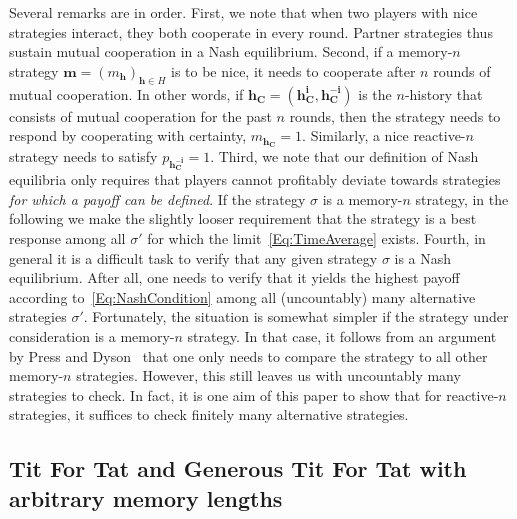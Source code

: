 \documentclass[9pt,twoside,lineno]{pnas-new}
\theoremstyle{plainCl1}
\theoremstyle{plainCl2}
\begin{document}
\noindent
Several remarks are in order. First, we note that when two players with nice strategies interact, they both cooperate in every round. Partner strategies thus sustain mutual cooperation in a Nash equilibrium. 
Second, if a memory-$n$ strategy $\mathbf{m}\!=\!(m_\mathbf{h})_{\mathbf{h}\in H}$ is to be nice, it needs to cooperate after $n$ rounds of mutual cooperation. In other words, if $\mathbf{h_C} \!=\! (\mathbf{h^i_C},\mathbf{h^{-i}_C})$ is the $n$-history that consists of mutual cooperation for the past $n$ rounds, then the strategy needs to respond by cooperating with certainty, $m_\mathbf{h_C}\!=\!1$.  Similarly, a nice reactive-$n$ strategy needs to satisfy $p_\mathbf{h^{-i}_C}\!=\!1$.
Third, we note that our definition of Nash equilibria only requires that players cannot profitably deviate towards strategies {\it for which a payoff can be defined}. If the strategy $\sigma$ is a memory-$n$ strategy, in the following we make the slightly looser requirement that the strategy is a best response among all $\sigma'$ for which the limit~\eqref{Eq:TimeAverage} exists. 
Fourth, in general it is a difficult task to verify that any given strategy $\sigma$ is a Nash equilibrium. 
After all, one needs to verify that it yields the highest payoff according to~\eqref{Eq:NashCondition} among all (uncountably) many alternative strategies $\sigma'$. 
Fortunately, the situation is somewhat simpler if the strategy under consideration is a memory-$n$ strategy. 
In that case, it follows from an argument by Press and Dyson~\cite{press:PNAS:2012}  that one only needs to compare the strategy to all other memory-$n$ strategies. 
However, this still leaves us with uncountably many strategies to check. 
In fact, it is one aim of this paper to show that for reactive-$n$ strategies, it suffices to check finitely many alternative strategies. 




\subsection{Tit For Tat and Generous Tit For Tat with arbitrary memory lengths}\label{section:tft_and_gtft}
\end{document}
